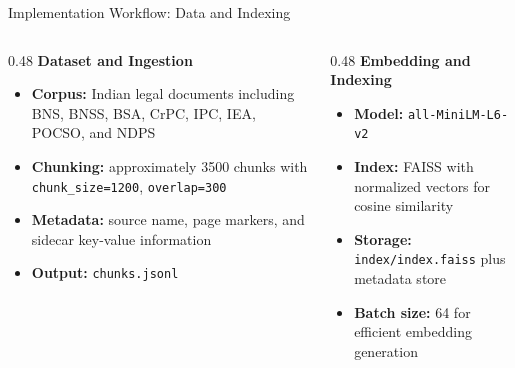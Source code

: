\documentclass[aspectratio=169]{beamer}
\begin{document}
\begin{frame}{Implementation Workflow: Data and Indexing}
    \small
    \begin{columns}[t]
        \begin{column}{0.48\textwidth}
            \textbf{Dataset and Ingestion}
            \begin{itemize}
                \item \textbf{Corpus:} Indian legal documents including BNS, BNSS, BSA, CrPC, IPC, IEA, POCSO, and NDPS
                \item \textbf{Chunking:} approximately 3500 chunks with \texttt{chunk\_size=1200}, \texttt{overlap=300}
                \item \textbf{Metadata:} source name, page markers, and sidecar key-value information
                \item \textbf{Output:} \texttt{chunks.jsonl}
            \end{itemize}
        \end{column}
        \begin{column}{0.48\textwidth}
            \textbf{Embedding and Indexing}
            \begin{itemize}
                \item \textbf{Model:} \texttt{all-MiniLM-L6-v2}
                \item \textbf{Index:} FAISS with normalized vectors for cosine similarity
                \item \textbf{Storage:} \texttt{index/index.faiss} plus metadata store
                \item \textbf{Batch size:} 64 for efficient embedding generation
            \end{itemize}
        \end{column}
    \end{columns}
\end{frame}
\end{document}
